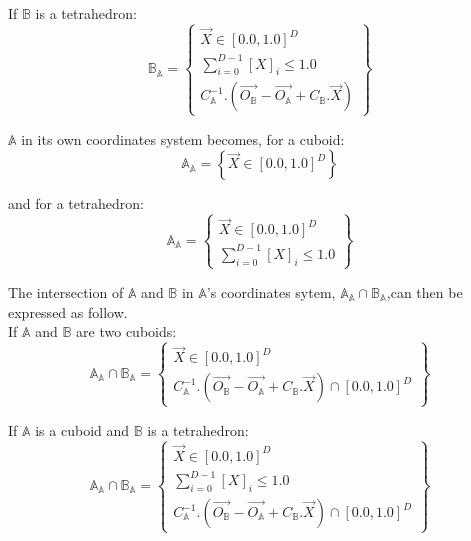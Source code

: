 \documentclass[12pt, a4paper]{article}
\begin{document}
If $\mathbb{B}$ is a tetrahedron:
\begin{equation}
\mathbb{B}_\mathbb{A}=\left\lbrace
\begin{array}{c}
\overrightarrow{X}\in[0.0,1.0]^D\\
\sum_{i=0}^{D-1}\left[X\right]_i\le1.0\\
C_\mathbb{A}^{-1}.(\overrightarrow{O_\mathbb{B}}-\overrightarrow{O_\mathbb{A}}+C_\mathbb{B}.\overrightarrow{X})
\end{array}
\right\rbrace
\end{equation}

$\mathbb{A}$ in its own coordinates system becomes, for a cuboid:
\begin{equation}
\mathbb{A}_\mathbb{A}=\left\lbrace\overrightarrow{X}\in[0.0,1.0]^D\right\rbrace
\end{equation}

and for a tetrahedron:
\begin{equation}
\mathbb{A}_\mathbb{A}=\left\lbrace
\begin{array}{c}
\overrightarrow{X}\in[0.0,1.0]^D\\
\sum_{i=0}^{D-1}\left[X\right]_i\le1.0
\end{array}
\right\rbrace
\end{equation}

The intersection of $\mathbb{A}$ and $\mathbb{B}$ in $\mathbb{A}$'s coordinates sytem, $\mathbb{A}_\mathbb{A}\cap\mathbb{B}_\mathbb{A}$,can then be expressed as follow.\\

If $\mathbb{A}$ and $\mathbb{B}$ are two cuboids:
\begin{equation}
\mathbb{A}_\mathbb{A}\cap\mathbb{B}_\mathbb{A}=\left\lbrace
\begin{array}{c}
\overrightarrow{X}\in[0.0,1.0]^D\\
C_\mathbb{A}^{-1}.\left(\overrightarrow{O_\mathbb{B}}-\overrightarrow{O_\mathbb{A}}+C_\mathbb{B}.\overrightarrow{X}\right)\cap[0.0,1.0]^D
\end{array}
\right\rbrace
\end{equation}

If $\mathbb{A}$ is a cuboid and $\mathbb{B}$ is a tetrahedron:
\begin{equation}
\mathbb{A}_\mathbb{A}\cap\mathbb{B}_\mathbb{A}=\left\lbrace
\begin{array}{c}
\overrightarrow{X}\in[0.0,1.0]^D\\
\sum_{i=0}^{D-1}\left[X\right]_i\le1.0\\
C_\mathbb{A}^{-1}.\left(\overrightarrow{O_\mathbb{B}}-\overrightarrow{O_\mathbb{A}}+C_\mathbb{B}.\overrightarrow{X}\right)\cap[0.0,1.0]^D
\end{array}
\right\rbrace
\end{equation}
\end{document}
